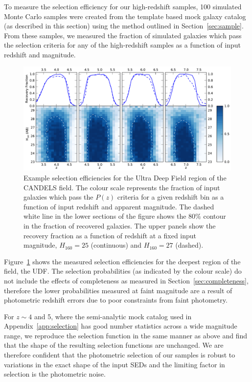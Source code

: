 To measure the selection efficiency for our high-redshift samples, 100 simulated Monte Carlo samples were created from the template based mock galaxy catalog (as described in this section) using the method outlined in Section~\ref{sec:sample}. From these samples, we measured the fraction of simulated galaxies which pass the selection criteria for any of the high-redshift samples as a function of input redshift and magnitude.

\begin{figure}
\centering
\includegraphics[width=\textwidth]{plots/fig4.pdf}
\caption[Short caption]{Example selection efficiencies for the Ultra Deep Field region of the CANDELS field. The colour scale represents the fraction of input galaxies which pass the $P(z)$ criteria for a given redshift bin as a function of input redshift and apparent magnitude. The dashed white line in the lower sections of the figure shows the 80\% contour in the fraction of recovered galaxies. The upper panels show the recovery fraction as a function of redshift at a fixed input magnitude, $H_{160} = 25$ (continuous) and $H_{160} = 27$ (dashed).}
\label{fig:selection}
\end{figure}

Figure~\ref{fig:selection} shows the measured selection efficiencies for  the deepest region of the field, the UDF. The selection probabilities (as indicated by the colour scale) do not include the effects of completeness as measured in Section~\ref{sec:completeness}, therefore the lower probabilities measured at faint magnitude are a result of photometric redshift errors due to poor constraints from faint photometry.

For $z\sim 4$ and 5, where the semi-analytic mock catalog used in Appendix~\ref{app:selection} has good number statistics across a wide magnitude range, we reproduce the selection function in the same manner as above and find that the shape of the resulting selection functions are unchanged. We are therefore confident that the photometric selection of our samples is robust to variations in the exact shape of the input SEDs and the limiting factor in selection is the photometric noise.

